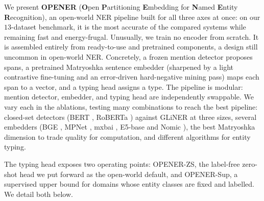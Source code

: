 \bigskip We present \textbf{OPENER} (\textbf{O}pen \textbf{P}artitioning \textbf{E}mbedding for \textbf{N}amed \textbf{E}ntity \textbf{R}ecognition), an open-world NER pipeline built for all three axes at once: on our $13$-dataset benchmark, it is the most accurate of the compared systems while remaining fast and energy-frugal. Unusually, we train no encoder from scratch. It is assembled entirely from ready-to-use and pretrained components, a design still uncommon in open-world NER.
Concretely, a frozen mention detector proposes spans, a pretrained Matryoshka sentence embedder (sharpened by a light contrastive fine-tuning and an error-driven hard-negative mining pass) maps each span to a vector, and a typing head assigns a type.
The pipeline is modular: mention detector, embedder, and typing head are independently swappable. We vary each in the ablations, testing many combinations to reach the best pipeline: closed-set detectors (BERT \cite{devlin2019bert}, RoBERTa \cite{liu2019roberta}) against GLiNER \cite{zaratiana2024gliner} at three sizes, several embedders (BGE \cite{xiao2024cpack}, MPNet \cite{song2020mpnet}, mxbai \cite{li2024aoe}, E5-base \cite{wang2022e5} and Nomic \cite{nussbaum2024nomic}), the best Matryoshka \cite{kusupati2022matryoshka} dimension to trade quality for computation, and different algorithms for entity typing.

The typing head exposes two operating points: OPENER-ZS, the label-free zero-shot head we put forward as the open-world default, and OPENER-Sup, a supervised upper bound for domains whose entity classes are fixed and labelled. We detail both below.

